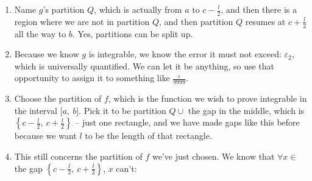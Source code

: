 \documentclass[12pt]{article}
\theoremstyle{plain}
\theoremstyle{remark}
\theoremstyle{definition}
\begin{document}
\begin{enumerate}
\def\labelenumi{\arabic{enumi}.}
\item
  Name \(g\)'s partition \(Q\), which is actually from \(a\) to
  \(c - \frac{l}{2}\), and then there is a region where we are not in
  partition \(Q\), and then partition \(Q\) resumes at
  \(c + \frac{l}{2}\) all the way to \(b\). Yes, partitions can be split
  up.
\item
  Because we know \(g\) is integrable, we know the error it must not
  exceed: \(\varepsilon_{2}\), which is universally quantified. We can
  let it be anything, so use that opportunity to assign it to something
  like \(\frac{\varepsilon}{9999}\).
\item
  Choose the partition of \(f\), which is the function we wish to prove
  integrable in the interval \(\lbrack a,\ b\rbrack\). Pick it to be
  partition \(Q \cup\) the gap in the middle, which is
  \(\left\{ c - \frac{l}{2},\ c + \frac{l}{2} \right\}\) -- just one
  rectangle, and we have made gaps like this before because we want
  \(l\) to be the length of that rectangle.
\item
  This still concerns the partition of \(f\) we've just chosen. We know
  that \(\forall x \in\) the gap
  \(\left\{ c - \frac{l}{2},\ c + \frac{l}{2} \right\}\), \(x\) can't:


\end{enumerate}
\end{document}
